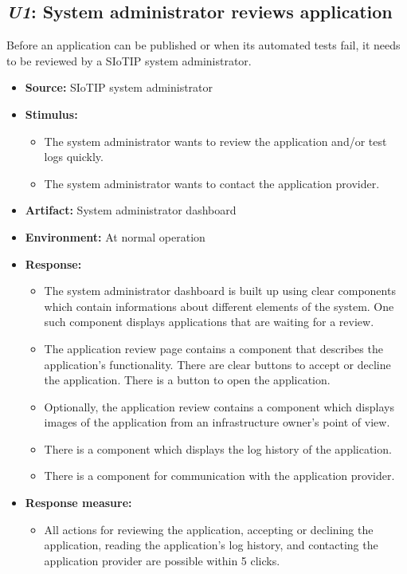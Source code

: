 \subsection{\emph{U1}: System administrator reviews application}
Before an application can be published or when its automated tests
fail, it needs to be reviewed by a SIoTIP system administrator.

\begin{itemize}
    \item \textbf{Source:} SIoTIP system administrator
    \item \textbf{Stimulus:}
        \begin{itemize}
            \item The system administrator wants to review the application
                  and/or test logs quickly.
            \item The system administrator wants to contact the application
                  provider.
        \end{itemize}
    \item \textbf{Artifact:} System administrator dashboard
    \item \textbf{Environment:} At normal operation
    \item \textbf{Response:}
        \begin{itemize}
            \item The system administrator dashboard is built up using clear
                  components which contain informations about different
                  elements of the system. One such component displays applications
                  that are waiting for a review.
            \item The application review page contains a component that
                  describes the application's functionality. There are clear
                  buttons to accept or decline the application. There is a
                  button to open the application.
            \item Optionally, the application review contains a component which
                  displays images  of the application from an infrastructure
                  owner's point of view.
            \item There is a component which displays the log history of the application.
            \item There is a component for communication with the application provider.
        \end{itemize}

    \item \textbf{Response measure:}
        \begin{itemize}
            \item All actions for reviewing the application, accepting or
                  declining the application, reading the application's log history,
                  and contacting the application provider are possible within 5 clicks.
        \end{itemize}
\end{itemize}

